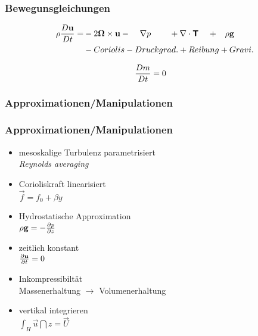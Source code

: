 \begin{frame}
\frametitle{Bewegunsgleichungen}
\begin{align}
	\rho \frac{D\mathbf{\bm{u}}}{Dt} 
	=
	&- 2\mathbf{\bm{\Omega}} \times \mathbf{\bm{u}} -\;\;\;\;\nabla p  \;\;\;\;\;\;\;\;    + \nabla \cdot\boldsymbol{\mathsf{T}}\;\;\;\; +\;\;\; \rho\mathbf{\bm{g}} \nonumber \\
	&-      Coriolis                -    Druckgrad.+             Reibung                 +   Gravi. 
\end{align}

\begin{align}
	\frac{Dm}{Dt}
	&=
	0
\end{align}

\end{frame}



\begin{frame}[noframenumber]
\frametitle{Approximationen/Manipulationen}
\end{frame}
\begin{frame}
\frametitle{Approximationen/Manipulationen}
\begin{itemize}
	\item<1-> 
	mesoskalige Turbulenz parametrisiert \\
	\textit{Reynolds averaging}
	\item<2-> 
	Corioliskraft linearisiert\\
	 $\vec{f} = f_{0} + \beta y$
	\item<3->
	Hydrostatische Approximation \\
	$\rho\mathbf{\bm{g}} = -\frac{\partial p}{\partial z}$ %
	\item<4->
	zeitlich konstant \\
	$\frac{\partial\mathbf{\bm{u}}}{\partial t} = 0$
	\item<5->
	Inkompressibiltät \\
	Massenerhaltung $\rightarrow$ Volumenerhaltung
	\item<6->
	vertikal integrieren \\
	$\int_{H} \vec{u} \dint{z}=	\vec{U}$
\end{itemize}
\end{frame}


